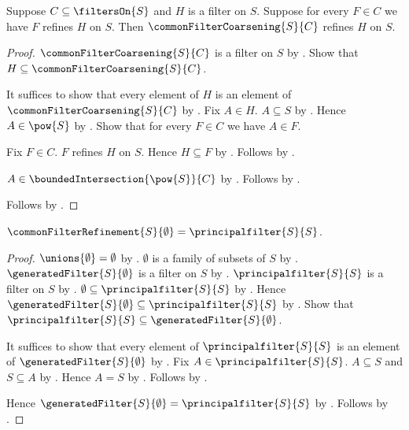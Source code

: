 \begin{theorem}\label{common_filter_coarsening_greatest}
    Suppose $C\subseteq\filtersOn{S}$ and $H$ is a filter on $S$.
    Suppose for every $F\in C$ we have $F$ refines $H$ on $S$.
    Then $\commonFilterCoarsening{S}{C}$ refines $H$ on $S$.
\end{theorem}
\begin{proof}
    $\commonFilterCoarsening{S}{C}$ is a filter on $S$ by
        .
    Show that $H\subseteq\commonFilterCoarsening{S}{C}$.
    \begin{subproof}
        It suffices to show that every element of $H$ is an element of
            $\commonFilterCoarsening{S}{C}$ by .
        Fix $A\in H$.
        $A\subseteq S$ by .
        Hence $A\in\pow{S}$ by .
        Show that for every $F\in C$ we have $A\in F$.
        \begin{subproof}
            Fix $F\in C$.
            $F$ refines $H$ on $S$.
            Hence $H\subseteq F$ by .
            Follows by .
        \end{subproof}
        $A\in\boundedIntersection{\pow{S}}{C}$ by
            .
        Follows by .
    \end{subproof}
    Follows by .
\end{proof}

\begin{proposition}\label{empty_common_filter_refinement}
    $\commonFilterRefinement{S}{\emptyset}
        =\principalfilter{S}{S}$.
\end{proposition}
\begin{proof}
    $\unions{\emptyset}=\emptyset$ by .
    $\emptyset$ is a family of subsets of $S$ by .
    $\generatedFilter{S}{\emptyset}$ is a filter on $S$ by
        .
    $\principalfilter{S}{S}$ is a filter on $S$ by
        .
    $\emptyset\subseteq\principalfilter{S}{S}$ by
        .
    Hence $\generatedFilter{S}{\emptyset}
        \subseteq\principalfilter{S}{S}$ by
        .
    Show that $\principalfilter{S}{S}
        \subseteq\generatedFilter{S}{\emptyset}$.
    \begin{subproof}
        It suffices to show that every element of
            $\principalfilter{S}{S}$ is an element of
            $\generatedFilter{S}{\emptyset}$ by .
        Fix $A\in\principalfilter{S}{S}$.
        $A\subseteq S$ and $S\subseteq A$ by
            .
        Hence $A=S$ by .
        Follows by .
    \end{subproof}
    Hence $\generatedFilter{S}{\emptyset}
        =\principalfilter{S}{S}$ by .
    Follows by .
\end{proof}

